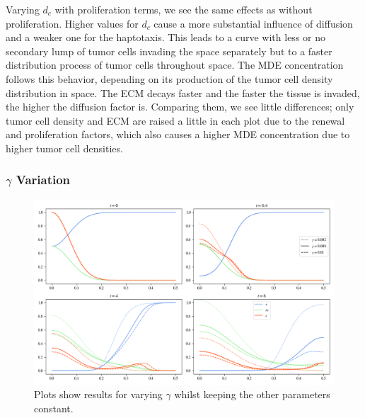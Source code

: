 Varying $d_c$ with proliferation terms, we see the same effects as without proliferation. Higher values for $d_c$ cause a more substantial influence of diffusion and a weaker one for the haptotaxis. This leads to a curve with less or no secondary lump of tumor cells invading the space separately but to a faster distribution process of tumor cells throughout space. The MDE concentration follows this behavior, depending on its production of the tumor cell density distribution in space. The ECM decays faster and the faster the tissue is invaded, the higher the diffusion factor is. Comparing them, we see little differences; only tumor cell density and ECM are raised a little in each plot due to the renewal and proliferation factors, which also causes a higher MDE concentration due to higher tumor cell densities.


\subsubsection*{$\gamma$ Variation}

\begin{figure}[h]
    \centering
    \includegraphics[width=\textwidth]{resources/images/prolif_gamma_variation.png}
    \caption{Plots show results for varying $\gamma$ whilst keeping the other parameters constant.}
    \label{fig:prolif_gamma_variation}
\end{figure}


